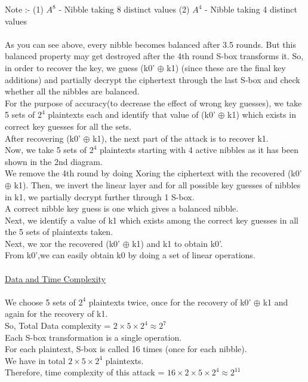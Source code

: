 \documentclass{transcrypto}
\begin{document}
Note :- (1) $A^8$ - Nibble taking 8 distinct values 
       (2) $A^4$ - Nibble taking 4 distinct values \\ \\
As you can see above, every nibble becomes balanced after 3.5 rounds.
But this balanced property may get destroyed after the 4th round S-box transforms it. So, in order to recover the key, we guess (k0' $\oplus$ k1) (since these are the final key additions) and partially decrypt the ciphertext through the last S-box and check whether all the nibbles are balanced. \\
For the purpose of accuracy(to decrease the effect of wrong key guesses), we take 5 sets of $2^4$ plaintexts each and identify that value of (k0' $\oplus$ k1) which exists in correct key guesses for all  the sets. \\
After recovering (k0' $\oplus$ k1), the next part of the attack is to recover k1.\\
Now, we take 5 sets of $2^4$ plaintexts starting with 4 active nibbles as it has been shown in the 2nd diagram. \\
We remove the 4th round by doing Xoring the ciphertext with the recovered (k0' $\oplus$ k1). Then, we invert the linear layer and for all possible key guesses of nibbles in k1, we partially decrypt further through 1 S-box. \\
A correct nibble key guess is one which gives a balanced nibble. \\
Next, we identify a value of k1 which exists among the correct key guesses in all the 5 sets of plaintexts taken. \\
Next, we xor the recovered (k0' $\oplus$ k1) and k1 to obtain k0'.\\
From k0',we can easily obtain k0 by doing a set of linear operations. \\  \\
\underline{Data and Time Complexity} \\ \\
We choose 5 sets of $2^4$ plaintexts twice, once for the recovery of k0' $\oplus$ k1 and again for the recovery of k1. \\
So, Total Data complexity = $2\times5\times2^4 \approx 2^7$ \\
Each S-box transformation is a single operation. \\
For each plaintext, S-box is called 16 times (once for each nibble).\\ 
We have in total $2\times5\times2^4$ plaintexts. \\
Therefore, time complexity of this attack = $16\times2\times5\times2^4 \approx 2^{11}$
\end{document}
